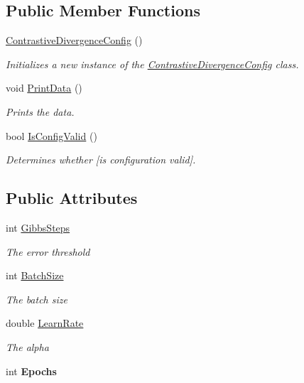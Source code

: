 \subsection*{Public Member Functions}
\begin{DoxyCompactItemize}
\item 
\hyperlink{class_contrastive_divergence_config_a7bdc6897aeb8e1ad3e09a92e62ec9e61}{Contrastive\+Divergence\+Config} ()
\begin{DoxyCompactList}\small\item\em Initializes a new instance of the \hyperlink{class_contrastive_divergence_config}{Contrastive\+Divergence\+Config} class. \end{DoxyCompactList}\item 
void \hyperlink{class_contrastive_divergence_config_ae9f613a4046f8545fedb37fe5a294c0e}{Print\+Data} ()
\begin{DoxyCompactList}\small\item\em Prints the data. \end{DoxyCompactList}\item 
bool \hyperlink{class_contrastive_divergence_config_ab168a8567c5309b0a61006747c4a44ce}{Is\+Config\+Valid} ()
\begin{DoxyCompactList}\small\item\em Determines whether \mbox{[}is configuration valid\mbox{]}. \end{DoxyCompactList}\end{DoxyCompactItemize}
\subsection*{Public Attributes}
\begin{DoxyCompactItemize}
\item 
int \hyperlink{class_contrastive_divergence_config_a9544c35ecb2c5adb8e51d12edc3c0510}{Gibbs\+Steps}
\begin{DoxyCompactList}\small\item\em The error threshold \end{DoxyCompactList}\item 
int \hyperlink{class_contrastive_divergence_config_ac8251503f35bac295b8b83220ace65fa}{Batch\+Size}
\begin{DoxyCompactList}\small\item\em The batch size \end{DoxyCompactList}\item 
double \hyperlink{class_contrastive_divergence_config_a826b90a2f85b952d7c633589b9574e52}{Learn\+Rate}
\begin{DoxyCompactList}\small\item\em The alpha \end{DoxyCompactList}\item 
\hypertarget{class_contrastive_divergence_config_a7c7c31e19877b3df6b38c896b74559b4}{}int {\bfseries Epochs}\label{class_contrastive_divergence_config_a7c7c31e19877b3df6b38c896b74559b4}

\end{DoxyCompactItemize}
